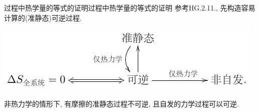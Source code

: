 \documentclass{ctexart}
\begin{document}
\begin{reflex}
	{过程中热学量的等式的证明}{过程中热学量的等式的证明} 参考HG.2.11., 先构造容易计算的(准静态)可逆过程.
\end{reflex}

\begin{finale}
	\centerline{
		\includegraphics{src/relations.pdf}
	}
	非热力学的情形下, 有摩擦的准静态过程不可逆, 且自发的力学过程可以可逆.
\end{finale}




\end{document}
